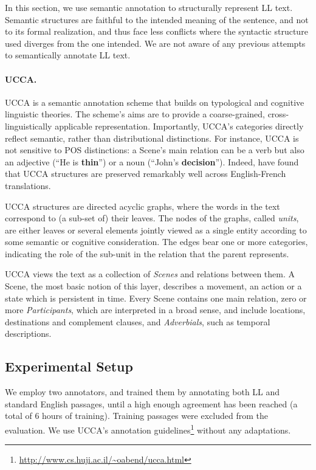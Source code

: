 \documentclass[letterpaper, 11pt]{article}
\begin{document}
In this section, we use semantic annotation to structurally
represent LL text. Semantic structures are faithful to the intended
meaning of the sentence, and not to its formal realization, and thus face
less conflicts where the syntactic structure used diverges from
the one intended. We are not aware of any previous attempts to semantically
annotate LL text.

\paragraph{UCCA.}\label{sec:ucca}
UCCA is a semantic annotation scheme that builds on
typological and cognitive linguistic theories.
The scheme's aims are to provide a coarse-grained, cross-linguistically
applicable representation.
Importantly, UCCA's categories directly reflect semantic, rather than
distributional distinctions.
For instance, UCCA is not sensitive to POS distinctions:
a Scene's main relation can be a verb but also an adjective
(``He is {\bf thin}'') or a noun (``John's {\bf decision}'').
Indeed,  have found that UCCA structures are
preserved remarkably well across English-French translations. 

UCCA structures are directed acyclic graphs, where the words in the text 
correspond to (a sub-set of) their leaves.
The nodes of the graphs, called {\it units}, are either leaves or several elements jointly
viewed as a single entity according to some semantic or cognitive consideration.
The edges bear one or more categories, indicating the role of 
the sub-unit in the relation that the parent represents.

UCCA views the text as a collection of {\it Scenes} and relations between them.
A Scene, the most basic notion of this layer, describes a movement, 
an action or a state which is persistent in time.
Every Scene contains one main relation, 
zero or more {\it Participants}, 
which are interpreted in a broad sense, 
and include locations, destinations and complement clauses,
and {\it Adverbials}, such as temporal descriptions.

\subsection{Experimental Setup}
We employ two annotators, and trained them by annotating both LL and standard English
passages, until a high enough agreement has been reached (a total of 6 hours of training).
Training passages were excluded from the evaluation.
We use UCCA's annotation guidelines\footnote{\url{http://www.cs.huji.ac.il/~oabend/ucca.html}} without any adaptations.
\end{document}
